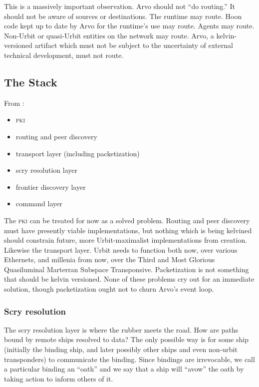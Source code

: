 \documentclass[twoside]{article}
\begin{document}
This is a massively important observation. Arvo should not ``do routing.'' It should not be aware of sources or destinations. The runtime may route. Hoon code kept up to date by Arvo for the runtime's use may route. Agents may route. Non-Urbit or quasi-Urbit entities on the network may route. Arvo, a kelvin-versioned artifact which must not be subject to the uncertainty of external technical development, must not route.

\subsection{The Stack}

From :

\begin{itemize}
  \item  \textsc{pki}
  \item  routing and peer discovery
  \item  transport layer (including packetization)
  \item  scry resolution layer
  \item  frontier discovery layer
  \item  command layer
\end{itemize}

The \textsc{pki} can be treated for now as a solved problem. Routing and peer discovery must have presently viable implementations, but nothing which is being kelvined should constrain future, more Urbit-maximalist implementations from creation. Likewise the transport layer. Urbit needs to function both now, over various Ethernets, and millenia from now, over the Third and Most Glorious Quasiluminal Marterran Subspace Transponsive. Packetization is not something that should be kelvin versioned. None of these problems cry out for an immediate solution, though packetization ought not to churn Arvo's event loop.

\subsubsection{Scry resolution}

The scry resolution layer is where the rubber meets the road. How are paths bound by remote ships resolved to data? The only possible way is for some ship (initially the binding ship, and later possibly other ships and even non-urbit transponders) to communicate the binding. Since bindings are irrevocable, we call a particular binding an ``oath'' and we say that a ship will ``avow'' the oath by taking action to inform others of it.
\end{document}
